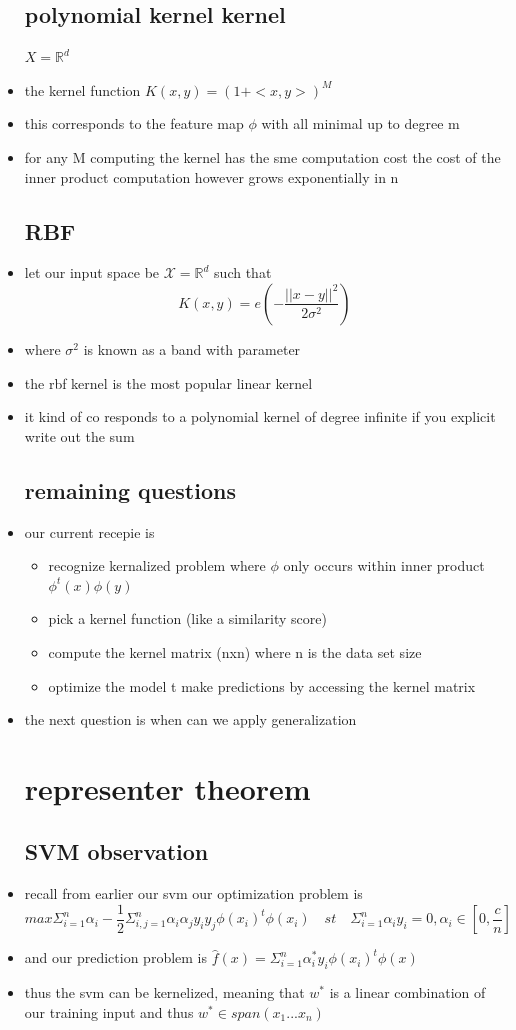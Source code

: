 \documentclass{article}
\begin{document}
\begin{itemize}
\subsection{polynomial kernel kernel}
$X=\mathbb{R}^{d}$
\item the kernel function $K(x,y)=(1+<x,y>)^M$
\item this corresponds to the feature map $\phi$ with all minimal up to degree m 
\item for any M computing the kernel has the sme computation cost 
\itme the cost of the inner product computation however grows exponentially in n 
\subsection{RBF}
\item let our input space be $\mathcal{X}=\mathbb{R}^{d}$ such that $$K(x,y)=e(-\frac{||x-y||^{2}}{2\sigma^{2}})$$
\item where $\sigma^2$ is known as a band with parameter 
\item the rbf kernel is the most popular linear kernel 
\item it kind of co responds to a polynomial kernel of degree infinite if you explicit write out the sum 
\subsection{remaining questions}
\item our current recepie is 
\begin{itemize}
    \item recognize kernalized problem where $\phi$ only occurs within inner product $\phi^{t}(x)\phi(y)$
    \item pick a kernel function (like a similarity score)
    \item compute the kernel matrix (nxn) where n is the data set size
    \item optimize the model t make predictions by accessing the kernel matrix 
\end{itemize}
\item the next question is when can we apply generalization 
\section{representer theorem}
\subsection{SVM observation}
\item  recall from earlier our  svm our optimization problem is 
 $$max \Sigma_{i=1}^{n}\alpha_{i}-\frac{1}{2}\Sigma_{i,j=1}^{n}\alpha_i\alpha_{j}y_iy_j\phi(x_i)^{t}\phi(x_i) \quad st \quad  \Sigma_{i=1}^{n}\alpha_{i}y_{i}=0, \alpha_{i}\in [0,\frac{c}{n}]$$
\item and our prediction problem is $\hat{f}(x)=\Sigma_{i=1}^{n}\alpha_{i}^{*}y_i\phi(x_i)^t\phi(x)$
\item thus the svm can be kernelized, meaning that $w^{*}$ is a linear combination of our training input and thus $w^{*}\in span(x_1...x_n)$

\end{itemize}
\end{document}
